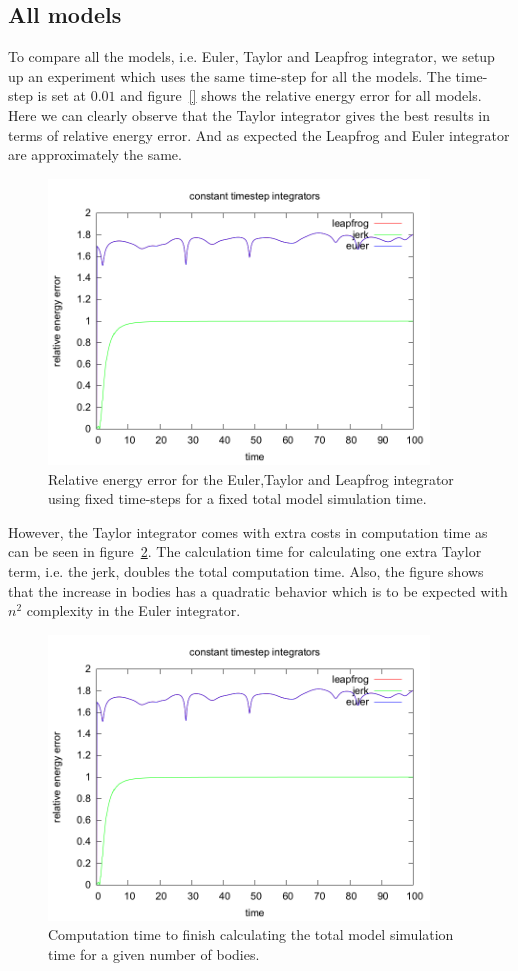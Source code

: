 \documentclass[11pt]{article} %
\begin{document}
\subsection{All models}
\label{sec:res:all}
To compare all the models, i.e. Euler, Taylor and Leapfrog integrator, we setup up an experiment which uses the same time-step for all the models. The time-step is set at $0.01$ and figure~\ref{} shows the relative energy error for all models. Here we can clearly observe that the Taylor integrator gives the best results in terms of relative energy error. And as expected the Leapfrog and Euler integrator are approximately the same. 
\begin{figure}
    \includegraphics[width=0.9\textwidth]{constant_time.png}
    \caption{Relative energy error for the Euler,Taylor and Leapfrog integrator using fixed time-steps for a fixed total model simulation time.}
    \label{fig:leapfrog}
\end{figure}
However, the Taylor integrator comes with extra costs in computation time as can be seen in figure~\ref{fig:time}. The calculation time for calculating one extra Taylor term, i.e. the jerk, doubles the total computation time. Also, the figure shows that the increase in bodies has a quadratic behavior which is to be expected with $n^2$ complexity in the Euler integrator. 
\begin{figure}
    \includegraphics[width=0.9\textwidth]{constant_time.png}
    \caption{Computation time to finish calculating the total model simulation time for a given number of bodies.}
    \label{fig:time}
\end{figure}
\end{document}
